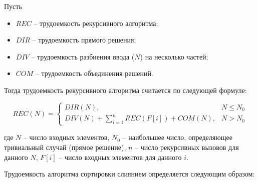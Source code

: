Пусть 

\begin{itemize}[label=---]
	\item $REC$ -- трудоемкость рекурсивного алгоритма;
	\item $DIR$ -- трудоемкость прямого решения;
	
	\clearpage 
	
	\item $DIV$ -- трудоемкость разбиения ввода ($N$) на несколько частей;
	\item $COM$ -- трудоемкость объединения решений.
\end{itemize}

Тогда трудоемкость рекурсивного алгоритма считается по следующей формуле:

\begin{equation}
	\label{eq:rec}
	REC(N) =
	\begin{cases}
		DIR(N), & N \leq N_0\\
		DIV(N) + \displaystyle\sum_{i=1}^{n} REC(F[i]) + COM(N), & N > N_0
	\end{cases}
\end{equation}

где $N$ -- число входных элементов, $N_0$ -- наибольшее число, определяющее тривиальный случай (прямое решение), $n$ -- число рекурсивных вызовов для данного $N$, $F[i]$ -- число входных элементов для данного $i$.

Трудоемкость алгоритма сортировки слиянием определяется следующим образом:

